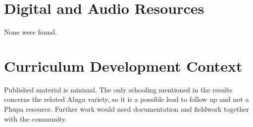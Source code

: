 \documentclass[12pt]{article}
\begin{document}
\section{Digital and Audio Resources}
None were found.

\section{Curriculum Development Context}
Published material is minimal. The only schooling mentioned in the results concerns the related Alugu variety, so it is a possible lead to follow up and not a Phupa resource. Further work would need documentation and fieldwork together with the community.
\end{document}
